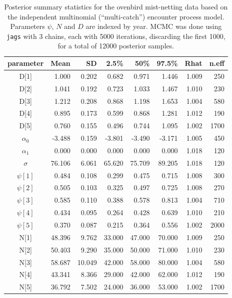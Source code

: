 \begin{table}[t!]
\centering
  \small
  \caption{Posterior summary statistics
for the ovenbird mist-netting data based on the
    independent multinomial (``multi-catch'') encounter process
    model. Parameters $\psi$, $N$ and $D$ are indexed by year.
MCMC was done using
    {\tt jags} with 3 chains, each with 5000 iterations, discarding
    the first 1000, for a total of 12000 posterior samples.}
  \begin{tabular}[t]{crrrrrrr}
    \hline \hline
parameter   &  Mean &  SD &  2.5\%  &  50\%  &  97.5\%  & Rhat &  n.eff \\
    \hline
D[1]  &   1.000 &  0.202&  0.682&  0.971&  1.446& 1.009 &  250\\
D[2]  &   1.041 &  0.192&  0.723&  1.033&  1.467& 1.010 &  230\\
D[3]  &   1.212 &  0.208&  0.868&  1.198&  1.653& 1.004 &  580\\
D[4]  &   0.895 &  0.173&  0.599&  0.868&  1.281& 1.012 &  190\\
D[5]  &   0.760 &  0.155&  0.496&  0.744&  1.095& 1.002 & 1700\\
$\alpha_0$&  -3.488 &  0.159& -3.801& -3.490& -3.171& 1.005 &  450 \\
$\alpha_1$&   0.000 &  0.000&  0.000&  0.000&  0.000& 1.018 &  120 \\
$\sigma$ &  76.106 &  6.061& 65.620& 75.709& 89.205& 1.018 &  120\\
$\psi[1]$&   0.484 &  0.108&  0.299&  0.475&  0.715& 1.008 &  300\\
$\psi[2]$&  0.505 &  0.103&  0.325&  0.497&  0.725& 1.008 &  270\\
$\psi[3]$&   0.585 &  0.110&  0.388&  0.578&  0.813& 1.004 &  710\\
$\psi[4]$&   0.434 &  0.095&  0.264&  0.428&  0.639& 1.010 &  210\\
$\psi[5]$&   0.370 &  0.087&  0.215&  0.364&  0.556& 1.002 & 2000\\
N[1]  &  48.396 &  9.762& 33.000& 47.000& 70.000& 1.009 &  250\\
N[2]  &  50.403 &  9.290& 35.000& 50.000& 71.000& 1.010 &  230\\
N[3]  &  58.687 & 10.049& 42.000& 58.000& 80.000& 1.004 &  580\\
N[4]  &  43.341 &  8.366& 29.000& 42.000& 62.000& 1.012 &  190\\
N[5]  &  36.792 &  7.502& 24.000& 36.000& 53.000& 1.002 & 1700\\
\hline
  \end{tabular}
  \label{scrovenbird.results}
\end {table}




